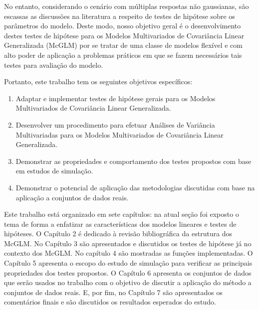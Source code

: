 No entanto, considerando o cenário com múltiplas respostas não gaussianas, são escassas as discussões na literatura a respeito de testes de hipótese sobre os parâmetros do modelo. Deste modo, nosso objetivo geral é o desenvolvimento destes testes de hipótese para os Modelos Multivariados de Covariância Linear Generalizada (McGLM) por se tratar de uma classe de modelos flexível e com alto poder de aplicação a problemas práticos em que se fazem necessários tais testes para avaliação do modelo.

Portanto, este trabalho tem os seguintes objetivos específicos:

\begin{enumerate}
  
  \item Adaptar e implementar testes de hipótese gerais para os Modelos Multivariados de Covariância Linear Generalizada.
  
  \item Desenvolver um procedimento para efetuar Análises de Variância Multivariadas para os Modelos Multivariados de Covariância Linear Generalizada.
  
  \item Demonstrar as propriedades e comportamento dos testes propostos com base em estudos de simulação.
  
  \item Demonstrar o potencial de aplicação das metodologias discutidas com base na aplicação a conjuntos de dados reais.
  
\end{enumerate}

Este trabalho está organizado em sete capítulos: na atual seção foi exposto o tema de forma a enfatizar as características dos modelos lineares e testes de hipóteses. O Capítulo 2 é dedicado à revisão bibliográfica da estrutura dos McGLM. No Capítulo 3 são apresentados e discutidos os testes de hipótese já no contexto dos McGLM. No capítulo 4 são mostradas as funções implementadas. O Capítulo 5 apresenta o escopo do estudo de simulação para verificar as principais propriedades dos testes propostos. O Capítulo 6 apresenta os conjuntos de dados que serão usados no trabalho com o objetivo de discutir a aplicação do método a conjuntos de dados reais. E, por fim, no Capítulo 7 são apresentados os comentários finais e são discutidos os resultados esperados do estudo.

